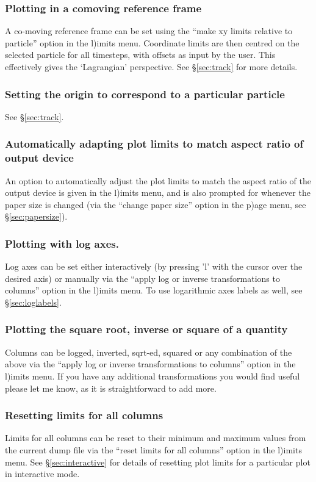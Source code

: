 \documentclass[a4paper,10pt]{article}
\begin{document}
\subsubsection{ Plotting in a comoving reference frame}
 A co-moving reference frame can be set using the ``make xy limits relative to particle'' option in the l)imits menu. Coordinate limits are then centred on the selected particle for all timesteps, with offsets as input by the user. This
effectively gives the `Lagrangian' perspective. See \S\ref{sec:track} for more details.

\subsubsection{ Setting the origin to correspond to a particular particle}
 See \S\ref{sec:track}.

\subsubsection{ Automatically adapting plot limits to match aspect ratio of output device}
 An option to automatically adjust the plot limits to match the aspect ratio of the output device is given in the l)imits menu, and is also prompted for whenever the paper size is changed (via the ``change paper size'' option in the p)age menu, see \S\ref{sec:papersize}).

\subsubsection{ Plotting with log axes.}
 Log axes can be set either interactively (by pressing 'l' with the cursor over the desired axis) or manually via the ``apply log or inverse transformations to columns'' option in the l)imits menu. To use logarithmic axes labels as well, see \S\ref{sec:loglabels}.

\subsubsection{ Plotting the square root, inverse or square of a quantity}
 Columns can be logged, inverted, sqrt-ed, squared or any combination of the above via the ``apply log or inverse transformations to columns'' option in the l)imits menu. If you have any additional transformations you would find useful please let me know, as it is straightforward to add more.

\subsubsection{ Resetting limits for all columns}
\label{sec:resetlimits}
 Limits for all columns can be reset to their minimum and maximum values from the current dump file via the ``reset limits for all columns'' option in the l)imits menu. See \S\ref{sec:interactive} for details of resetting plot limits for a particular plot in interactive mode. 
\end{document}
